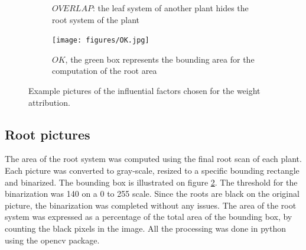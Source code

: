 \begin{figure}
\begin{subfigure}[t]{.13\textwidth}
  \caption{$OVERLAP$: the leaf system of another plant hides the root system of the plant}
  \label{fig:OVERLAP}
\end{subfigure}
%
\begin{subfigure}[t]{.13\textwidth}
  \centering
  \texttt{[image: figures/OK.jpg]}
  \caption{$OK$, the green box represents the bounding area for the computation of the root area}
  \label{fig:OK}
\end{subfigure}
%
\caption{Example pictures of the influential factors chosen for the weight attribution.}
\label{fig:example_influential_factors}
\end{figure}

\subsection{Root pictures}
The area of the root system was computed using the final root scan of each plant. Each picture was converted to gray-scale, resized to a specific bounding rectangle and binarized. The bounding box is illustrated on figure \ref{fig:OK}. The threshold for the binarization was 140 on a 0 to 255 scale. Since the roots are black on the original picture, the binarization was completed without any issues. The area of the root system was expressed as a percentage of the total area of the bounding box, by counting the black pixels in the image. All the processing was done in python using the opencv package.


